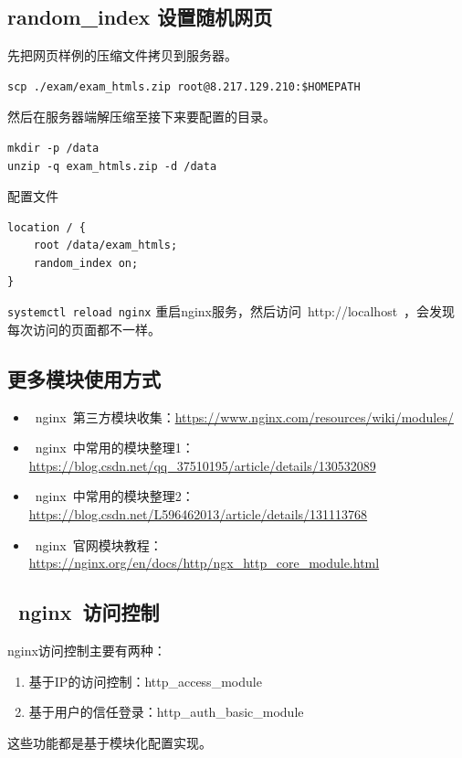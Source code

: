 \documentclass[12pt, a4paper]{article} %
\begin{document}
\begin{CJK*}{UTF8}{gbsn}
\subsection{random\_index 设置随机网页}

先把网页样例的压缩文件拷贝到服务器。

\begin{lstlisting}
scp ./exam/exam_htmls.zip root@8.217.129.210:$HOMEPATH
\end{lstlisting}

然后在服务器端解压缩至接下来要配置的目录。

\begin{lstlisting}
mkdir -p /data
unzip -q exam_htmls.zip -d /data
\end{lstlisting}

配置文件

\begin{lstlisting}
location / {
    root /data/exam_htmls;
    random_index on;
}
\end{lstlisting}

\verb|systemctl reload nginx| 重启nginx服务，然后访问~http://localhost~，会发现每次访问的页面都不一样。

\subsection{更多模块使用方式}

\begin{itemize}
    \item ~nginx~第三方模块收集：\url{https://www.nginx.com/resources/wiki/modules/}
    \item ~nginx~中常用的模块整理1：\url{https://blog.csdn.net/qq_37510195/article/details/130532089}
    \item ~nginx~中常用的模块整理2：\url{https://blog.csdn.net/L596462013/article/details/131113768}
    \item ~nginx~官网模块教程：\url{https://nginx.org/en/docs/http/ngx_http_core_module.html}
\end{itemize}

\subsection{~nginx~访问控制}
nginx访问控制主要有两种：
\begin{enumerate}
    \item 基于IP的访问控制：http\_access\_module
    \item 基于用户的信任登录：http\_auth\_basic\_module
\end{enumerate}
这些功能都是基于模块化配置实现。


\end{CJK*}
\end{document}
